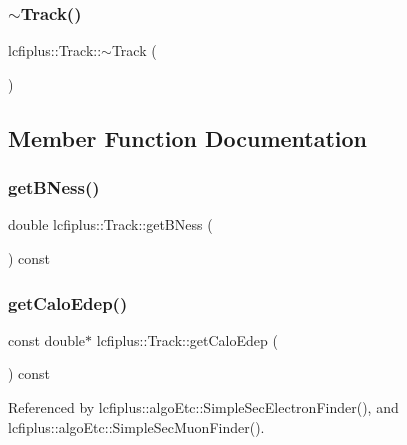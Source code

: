 \subsubsection{$\sim$\+Track()}
{\footnotesize\ttfamily lcfiplus\+::\+Track\+::$\sim$\+Track (\begin{DoxyParamCaption}{ }\end{DoxyParamCaption})\hspace{0.3cm}{\ttfamily [inline]}}



\subsection{Member Function Documentation}
\mbox{\label{classlcfiplus_1_1Track_a2748f8807ac18de93bbc4c3fa9d7d9f9}} 
\subsubsection{get\+B\+Ness()}
{\footnotesize\ttfamily double lcfiplus\+::\+Track\+::get\+B\+Ness (\begin{DoxyParamCaption}{ }\end{DoxyParamCaption}) const\hspace{0.3cm}{\ttfamily [inline]}}

\mbox{\label{classlcfiplus_1_1Track_a321ae46b530f893f978c3c99d8fca5e2}} 
\subsubsection{get\+Calo\+Edep()}
{\footnotesize\ttfamily const double$\ast$ lcfiplus\+::\+Track\+::get\+Calo\+Edep (\begin{DoxyParamCaption}{ }\end{DoxyParamCaption}) const\hspace{0.3cm}{\ttfamily [inline]}}



Referenced by lcfiplus\+::algo\+Etc\+::\+Simple\+Sec\+Electron\+Finder(), and lcfiplus\+::algo\+Etc\+::\+Simple\+Sec\+Muon\+Finder().

\mbox{\label{classlcfiplus_1_1Track_a6f29bd28d4748b1e009c75a9c13623d0}} 
